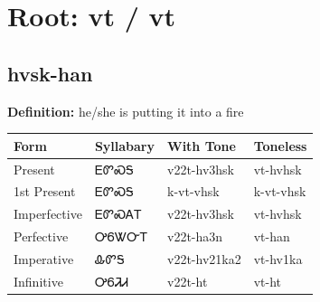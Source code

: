 \documentclass{article}%
\begin{document}
%
\normalsize%
\section*{Root: vt / vt}%
\subsection*{hvsk-han}%
\textbf{Definition: }%
he/she is putting it into a fire%
\\[0.5em]%
\begin{tabular}{|l|l|l|l|}%
\hline%
\textbf{Form}&\textbf{Syllabary}&\textbf{With Tone}&\textbf{Toneless}\\%
\hline%
Present&ᎬᏛᏍᎦ&v22t{-}hv3hsk&vt{-}hvhsk\\%
1st Present&ᎬᏛᏍᎦ&k{-}vt{-}vhsk&k{-}vt{-}vhsk\\%
Imperfective&ᎬᏛᏍᎪᎢ&v22t{-}hv3hsk&vt{-}hvhsk\\%
Perfective&ᎤᏮᏔᏅᎢ&v22t{-}ha3n&vt{-}han\\%
Imperative&ᎲᏛᎦ&v22t{-}hv21ka2&vt{-}hv1ka\\%
Infinitive&ᎤᏮᏘᏗ&v22t{-}ht&vt{-}ht\\%
\hline%
\end{tabular}%
\\[1em]%
\end{document}
